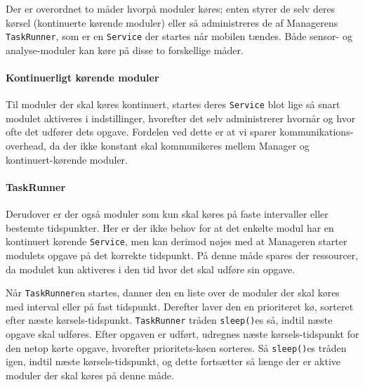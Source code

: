 Der er overordnet to måder hvorpå moduler køres; enten styrer de selv deres kørsel (kontinuerte kørende moduler) eller så administreres de af Managerens \texttt{TaskRunner}, som er en \texttt{Service} der startes når mobilen tændes.
Både sensor- og analyse-moduler kan køre på disse to forskellige måder.

\paragraph{Kontinuerligt kørende moduler}
Til moduler der skal køres kontinuert, startes deres \texttt{Service} blot lige så snart modulet aktiveres i indstillinger, hvorefter det selv administrerer hvornår og hvor ofte det udfører dets opgave.
Fordelen ved dette er at vi sparer kommunikations-overhead, da der ikke konstant skal kommunikeres mellem Manager og kontinuert-kørende moduler.

\paragraph{TaskRunner}
Derudover er der også moduler som kun skal køres på faste intervaller eller bestemte tidspunkter.
Her er der ikke behov for at det enkelte modul har en kontinuert kørende \texttt{Service}, men kan derimod nøjes med at Manageren starter modulets opgave på det korrekte tidspunkt.
På denne måde spares der ressourcer, da modulet kun aktiveres i den tid hvor det skal udføre sin opgave. 

Når \texttt{TaskRunner}en startes, danner den en liste over de moduler der skal køres med interval eller på fast tidspunkt.
Derefter laver den en prioriteret kø, sorteret efter næste kørsels-tidspunkt.
\texttt{TaskRunner} tråden \texttt{sleep()}es så, indtil næste opgave skal udføres.
Efter opgaven er udført, udregnes næste kørsels-tidspunkt for den netop kørte opgave, hvorefter prioritets-køen sorteres.
Så \texttt{sleep()}es tråden igen, indtil næste kørsels-tidspunkt, og dette fortsætter så længe der er aktive moduler der skal køres på denne måde.
